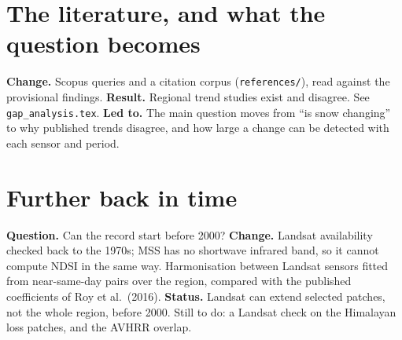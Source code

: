 \documentclass[11pt,a4paper]{article}
\begin{document}
\section{The literature, and what the question becomes}
\textbf{Change.} Scopus queries and a citation corpus (\texttt{references/}), read against the provisional findings.
\textbf{Result.} Regional trend studies exist and disagree. See \texttt{gap\_analysis.tex}.
\textbf{Led to.} The main question moves from ``is snow changing'' to why published trends disagree, and how large a
change can be detected with each sensor and period.

\section{Further back in time}
\textbf{Question.} Can the record start before 2000?
\textbf{Change.} Landsat availability checked back to the 1970s; MSS has no shortwave infrared band, so it cannot
compute NDSI in the same way. Harmonisation between Landsat sensors fitted from near-same-day pairs over the region,
compared with the published coefficients of Roy et al.\ (2016).
\textbf{Status.} Landsat can extend selected patches, not the whole region, before 2000. Still to do: a Landsat check on
the Himalayan loss patches, and the AVHRR overlap.
\end{document}
